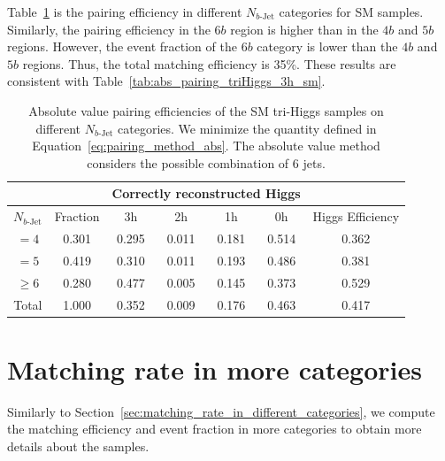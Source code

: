 \documentclass[12pt]{article}
\begin{document}
    Table~\ref{tab:sm_abs_pairing_3h_nbj} is the pairing efficiency in different $N_{b\text{-Jet}}$ categories for SM samples. Similarly, the pairing efficiency in the $6b$ region is higher than in the $4b$ and $5b$ regions. However, the event fraction of the $6b$ category is lower than the $4b$ and $5b$ regions. Thus, the total matching efficiency is 35\%. These results are consistent with Table~\ref{tab:abs_pairing_triHiggs_3h_sm}.
    \begin{table}[htpb]
		\centering
		\caption{Absolute value pairing efficiencies of the SM tri-Higgs samples on different $N_{b\text{-Jet}}$ categories. We minimize the quantity defined in Equation~\ref{eq:pairing_method_abs}. The absolute value method considers the possible combination of 6 jets.}
		\label{tab:sm_abs_pairing_3h_nbj}
        \begin{tabular}{c|c|cccc|c}
        \multicolumn{1}{l|}{} &          & \multicolumn{4}{c|}{Correctly reconstructed Higgs} & \multicolumn{1}{l}{} \\ \hline
        $N_{b\text{-Jet}}$    & Fraction & 3h          & 2h         & 1h         & 0h         & Higgs Efficiency     \\ \hline
        $=4$                  & 0.301 & 0.295 & 0.011 & 0.181 & 0.514 & 0.362 \\
        $=5$                  & 0.419 & 0.310 & 0.011 & 0.193 & 0.486 & 0.381 \\
        $\ge 6$               & 0.280 & 0.477 & 0.005 & 0.145 & 0.373 & 0.529 \\ \hline
        Total                 & 1.000 & 0.352 & 0.009 & 0.176 & 0.463 & 0.417 
		\end{tabular}
	\end{table}
\section{Matching rate in more categories}%
\label{sec:matching_rate_in_more_categories}
	Similarly to Section~\ref{sec:matching_rate_in_different_categories}, we compute the matching efficiency and event fraction in more categories to obtain more details about the samples.
\end{document}
